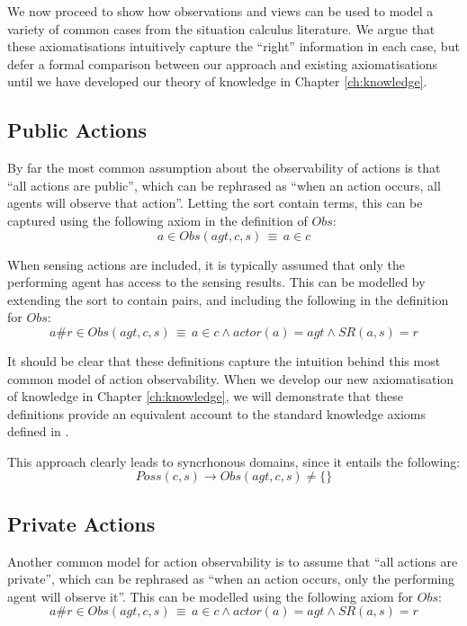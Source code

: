 We now proceed to show how observations and views can be used to model
a variety of common cases from the situation calculus literature.
We argue that these axiomatisations intuitively capture the {}``right''
information in each case, but defer a formal comparison between our
approach and existing axiomatisations until we have developed our
theory of knowledge in Chapter \ref{ch:knowledge}.


\subsection{Public Actions}

By far the most common assumption about the observability of actions
is that {}``all actions are public'', which can be rephrased as
{}``when an action occurs, all agents will observe that action''.
Letting the sort contain terms, this
can be captured using the following axiom in the definition of $Obs$:\[
a\in Obs(agt,c,s)\,\equiv\, a\in c\]


When sensing actions are included, it is typically assumed that only
the performing agent has access to the sensing results. This can be
modelled by extending the  sort to contain 
pairs, and including the following in the definition for $Obs$:\[
a\#r\in Obs(agt,c,s)\,\equiv\, a\in c\wedge actor(a)=agt\wedge SR(a,s)=r\]


It should be clear that these definitions capture the intuition behind
this most common model of action observability. When we develop our
new axiomatisation of knowledge in Chapter \ref{ch:knowledge}, we
will demonstrate that these definitions provide an equivalent account
to the standard knowledge axioms defined in \citep{scherl03sc_knowledge}.

This approach clearly leads to syncrhonous domains, since it entails
the following:\[
Poss(c,s)\rightarrow Obs(agt,c,s)\neq\{\}\]



\subsection{Private Actions}

Another common model for action observability is to assume that {}``all
actions are private'', which can be rephrased as {}``when an action
occurs, only the performing agent will observe it''. This can be
modelled using the following axiom for $Obs$:\[
a\#r\in Obs(agt,c,s)\,\equiv\, a\in c\wedge actor(a)=agt\wedge SR(a,s)=r\]


